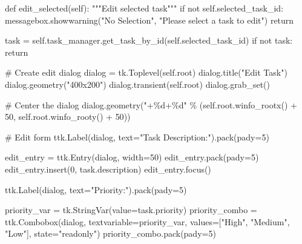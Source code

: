 \documentclass[
  letterpaper,
  DIV=11,
  numbers=noendperiod,
  oneside]{scrreprt}
\newenvironment{Shaded}{}{}
\newcommand{\CommentTok}[1]{\textcolor[rgb]{0.42,0.45,0.49}{#1}}
\newcommand{\ControlFlowTok}[1]{\textcolor[rgb]{0.84,0.23,0.29}{#1}}
\newcommand{\DecValTok}[1]{\textcolor[rgb]{0.00,0.36,0.77}{#1}}
\newcommand{\KeywordTok}[1]{\textcolor[rgb]{0.84,0.23,0.29}{#1}}
\newcommand{\NormalTok}[1]{\textcolor[rgb]{0.14,0.16,0.18}{#1}}
\newcommand{\OperatorTok}[1]{\textcolor[rgb]{0.14,0.16,0.18}{#1}}
\newcommand{\SpecialCharTok}[1]{\textcolor[rgb]{0.00,0.36,0.77}{#1}}
\newcommand{\StringTok}[1]{\textcolor[rgb]{0.01,0.18,0.38}{#1}}
\newcommand{\VariableTok}[1]{\textcolor[rgb]{0.89,0.38,0.04}{#1}}
\begin{document}
\begin{Shaded}
\begin{Highlighting}[]
    \KeywordTok{def}\NormalTok{ edit\_selected(}\VariableTok{self}\NormalTok{):}
        \CommentTok{"""Edit selected task"""}
        \ControlFlowTok{if} \KeywordTok{not} \VariableTok{self}\NormalTok{.selected\_task\_id:}
\NormalTok{            messagebox.showwarning(}\StringTok{"No Selection"}\NormalTok{, }\StringTok{"Please select a task to edit"}\NormalTok{)}
            \ControlFlowTok{return}
        
\NormalTok{        task }\OperatorTok{=} \VariableTok{self}\NormalTok{.task\_manager.get\_task\_by\_id(}\VariableTok{self}\NormalTok{.selected\_task\_id)}
        \ControlFlowTok{if} \KeywordTok{not}\NormalTok{ task:}
            \ControlFlowTok{return}
        
        \CommentTok{\# Create edit dialog}
\NormalTok{        dialog }\OperatorTok{=}\NormalTok{ tk.Toplevel(}\VariableTok{self}\NormalTok{.root)}
\NormalTok{        dialog.title(}\StringTok{"Edit Task"}\NormalTok{)}
\NormalTok{        dialog.geometry(}\StringTok{"400x200"}\NormalTok{)}
\NormalTok{        dialog.transient(}\VariableTok{self}\NormalTok{.root)}
\NormalTok{        dialog.grab\_set()}
        
        \CommentTok{\# Center the dialog}
\NormalTok{        dialog.geometry(}\StringTok{"+}\SpecialCharTok{\%d}\StringTok{+}\SpecialCharTok{\%d}\StringTok{"} \OperatorTok{\%}\NormalTok{ (}\VariableTok{self}\NormalTok{.root.winfo\_rootx() }\OperatorTok{+} \DecValTok{50}\NormalTok{, }
                                   \VariableTok{self}\NormalTok{.root.winfo\_rooty() }\OperatorTok{+} \DecValTok{50}\NormalTok{))}
        
        \CommentTok{\# Edit form}
\NormalTok{        ttk.Label(dialog, text}\OperatorTok{=}\StringTok{"Task Description:"}\NormalTok{).pack(pady}\OperatorTok{=}\DecValTok{5}\NormalTok{)}
        
\NormalTok{        edit\_entry }\OperatorTok{=}\NormalTok{ ttk.Entry(dialog, width}\OperatorTok{=}\DecValTok{50}\NormalTok{)}
\NormalTok{        edit\_entry.pack(pady}\OperatorTok{=}\DecValTok{5}\NormalTok{)}
\NormalTok{        edit\_entry.insert(}\DecValTok{0}\NormalTok{, task.description)}
\NormalTok{        edit\_entry.focus()}
        
\NormalTok{        ttk.Label(dialog, text}\OperatorTok{=}\StringTok{"Priority:"}\NormalTok{).pack(pady}\OperatorTok{=}\DecValTok{5}\NormalTok{)}
        
\NormalTok{        priority\_var }\OperatorTok{=}\NormalTok{ tk.StringVar(value}\OperatorTok{=}\NormalTok{task.priority)}
\NormalTok{        priority\_combo }\OperatorTok{=}\NormalTok{ ttk.Combobox(dialog, textvariable}\OperatorTok{=}\NormalTok{priority\_var,}
\NormalTok{                                     values}\OperatorTok{=}\NormalTok{[}\StringTok{"High"}\NormalTok{, }\StringTok{"Medium"}\NormalTok{, }\StringTok{"Low"}\NormalTok{], }
\NormalTok{                                     state}\OperatorTok{=}\StringTok{"readonly"}\NormalTok{)}
\NormalTok{        priority\_combo.pack(pady}\OperatorTok{=}\DecValTok{5}\NormalTok{)}
        

\end{Highlighting}
\end{Shaded}
\end{document}
